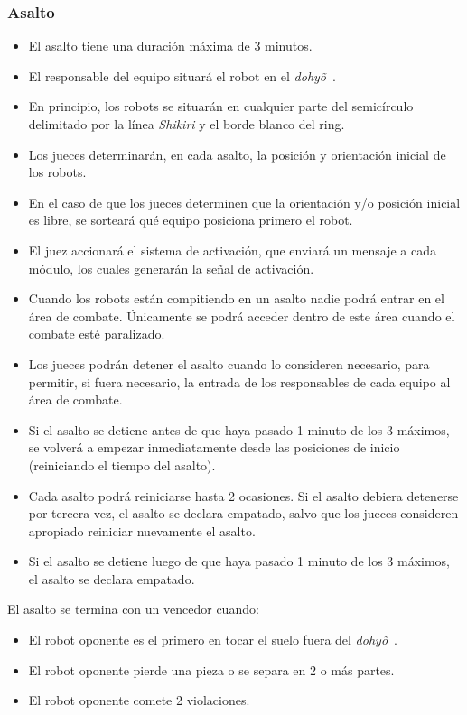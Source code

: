 \documentclass[a4paper,11pt]{article}
\newcommand{\dojo}{\emph{dohy\~{o}}~}
\begin{document}
\subsubsection*{Asalto}
\begin{itemize}
\item El asalto tiene una duración máxima de 3 minutos.
\item El responsable del equipo situará el robot en el \dojo.
\item En principio, los robots se situarán en cualquier parte del semicírculo delimitado por la línea \emph{Shikiri} y el borde blanco del ring.
\item Los jueces determinarán, en cada asalto, la posición y orientación inicial de los robots.
\item En el caso de que los jueces determinen que la orientación y/o posición inicial es libre, se sorteará qué equipo posiciona primero el robot.
\item El juez accionará el sistema de activación, que enviará un mensaje a cada módulo, los cuales generarán la señal de activación.
\item Cuando los robots están compitiendo en un asalto nadie podrá entrar en el área de combate. Únicamente se podrá acceder dentro de este área cuando el combate esté paralizado.
\item Los jueces podrán detener el asalto cuando lo consideren necesario, para permitir, si fuera necesario, la entrada de los responsables de cada equipo al área de combate.
\item Si el asalto se detiene antes de que haya pasado 1 minuto de los 3 máximos, se volverá a empezar inmediatamente desde las posiciones de inicio (reiniciando el tiempo del asalto).
\item Cada asalto podrá reiniciarse hasta 2 ocasiones. Si el asalto debiera detenerse por tercera vez, el asalto se declara empatado, salvo que los jueces consideren apropiado reiniciar nuevamente el asalto.
\item Si el asalto se detiene luego de que haya pasado 1 minuto de los 3 máximos, el asalto se declara empatado.
\end{itemize}

El asalto se termina con un vencedor cuando:
\begin{itemize}
\item El robot oponente es el primero en tocar el suelo fuera del \dojo.
\item El robot oponente pierde una pieza o se separa en 2 o más partes.
\item El robot oponente comete 2 violaciones.
\end{itemize}
\end{document}
